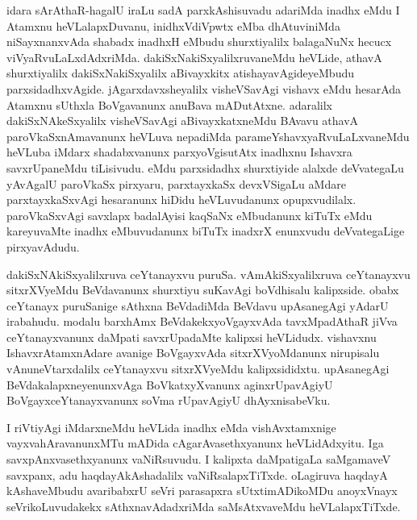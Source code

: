 \stext

\begin{artha}
idara sArAthaR-hagalU iraLu sadA parxkAshisuvadu adariMda inadhx eMdu I Atamxnu heVLalapxDuvanu, inidhxVdiVpwtx eMba dhAtuviniMda niSayxnanxvAda shabadx inadhxH eMbudu shurxtiyalilx balagaNuNx hecucx viVyaRvuLaLxdAdxriMda. dakiSxNakiSxyalilxruvaneMdu heVLide, athavA shurxtiyalilx dakiSxNakiSxyalilx aBivayxkitx atishayavAgideyeMbudu parxsidadhxvAgide. jAgarxdavxsheyalilx visheVSavAgi vishavx eMdu hesarAda Atamxnu sUthxla BoVgavanunx anuBava mADutAtxne. adaralilx dakiSxNAkeSxyalilx visheVSavAgi aBivayxkatxneMdu BAvavu athavA paroVkaSxnAmavanunx heVLuva nepadiMda parameYshavxyaRvuLaLxvaneMdu heVLuba iMdarx shadabxvanunx parxyoVgisutAtx inadhxnu Ishavxra savxrUpaneMdu tiLisivudu. \stext eMdu parxsidadhx shurxtiyide alalxde deVvategaLu yAvAgalU paroVkaSx pirxyaru, parxtayxkaSx devxVSigaLu aMdare parxtayxkaSxvAgi hesaranunx hiDidu heVLuvudanunx opupxvudilalx. paroVkaSxvAgi savxlapx badalAyisi kaqSaNx eMbudanunx kiTuTx eMdu kareyuvaMte inadhx eMbuvudanunx biTuTx inadxrX enunxvudu deVvategaLige pirxyavAdudu. 
\end{artha}


\begin{artha}
dakiSxNAkiSxyalilxruva ceYtanayxvu puruSa. vAmAkiSxyalilxruva ceYtanayxvu sitxrXVyeMdu BeVdavanunx shurxtiyu suKavAgi boVdhisalu kalipxside. obabx ceYtanayx puruSanige sAthxna BeVdadiMda BeVdavu upAsanegAgi yAdarU irabahudu. modalu barxhAmx BeVdakekxyoVgayxvAda tavxMpadAthaR jiVva ceYtanayxvanunx daMpati savxrUpadaMte kalipxsi heVLidudx. vishavxnu IshavxrAtamxnAdare avanige BoVgayxvAda sitxrXVyoMdanunx nirupisalu vAnuneVtarxdalilx ceYtanayxvu sitxrXVyeMdu kalipxsididxtu. upAsanegAgi BeVdakalapxneyenunxvAga BoVkatxyXvanunx aginxrUpavAgiyU BoVgayxceYtanayxvanunx soVma rUpavAgiyU dhAyxnisabeVku.
\end{artha}

\begin{artha}
I riVtiyAgi iMdarxneMdu heVLida inadhx eMda vishAvxtamxnige vayxvahAravanunxMTu mADida cAgarAvasethxyanunx heVLidAdxyitu. Iga savxpAnxvasethxyanunx vaNiRsuvudu. I kalipxta daMpatigaLa saMgamaveV savxpanx, adu haqdayAkAshadalilx vaNiRsalapxTiTxde. oLagiruva haqdayA kAshaveMbudu avaribabxrU seVri parasapxra sUtxtimADikoMDu anoyxVnayx seVrikoLuvudakekx sAthxnavAdadxriMda saMsAtxvaveMdu heVLalapxTiTxde. 
\end{artha}

